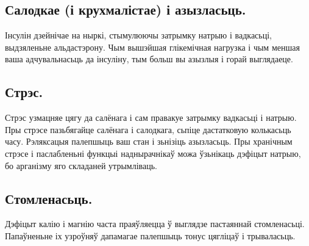 \subsection{Салодкае (і крухмалістае) і азызласьць.}
Інсулін дзейнічае на ныркі, стымулюючы затрымку натрыю і вадкасьці, выдзяленьне альдастэрону. Чым вышэйшая глікемічная нагрузка і чым меншая ваша адчувальнасьць да інсуліну, тым больш вы азызлыя і горай выглядаеце.

\subsection{Стрэс.}
Стрэс узмацняе цягу да салёнага і сам правакуе затрымку вадкасьці і натрыю. Пры стрэсе пазьбягайце салёнага і салодкага, сьпіце дастатковую колькасьць часу. Рэляксацыя палепшыць ваш стан і зьнізіць азызласьць. Пры хранічным стрэсе і паслабленьні функцыі наднырачнікаў можа ўзьнікаць дэфіцыт натрыю, бо арганізму яго складаней утрымліваць.

\subsection{Стомленасьць.}
Дэфіцыт калію і магнію часта праяўляецца ў выглядзе пастаяннай стомленасьці. Папаўненьне іх узроўняў дапамагае палепшыць тонус цягліцаў і трываласьць.
